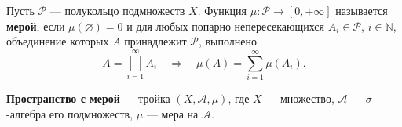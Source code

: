 \label{definition:13}

\begin{definition}
Пусть $\mathcal P$ --- полукольцо подмножеств $X$.
Функция $\mu:\mathcal P\to[0,+\infty]$ называется \textbf{мерой}, если $\mu(\varnothing)=0$ и для любых попарно непересекающихся $A_i\in\mathcal P$, $i\in\mathbb N$, объединение которых $A$ принадлежит $\mathcal P$, выполнено
\[
  A=\bigsqcup_{i=1}^{\infty}A_i
  \quad\Longrightarrow\quad
  \mu(A)=\sum_{i=1}^{\infty}\mu(A_i).
\]
\end{definition}

\begin{definition}
\textbf{Пространство с мерой} --- тройка $(X,\mathcal A,\mu)$, где $X$ --- множество, $\mathcal A$ --- $\sigma$-алгебра его подмножеств, $\mu$ --- мера на $\mathcal A$.
\end{definition}

